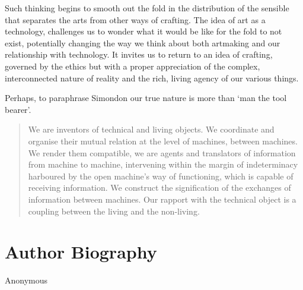 \documentclass[letterpaper]{article}
\begin{document}
    Such thinking begins to smooth out the fold in the distribution of the sensible that separates the arts from other ways of crafting. The idea of art as a technology, challenges us to wonder what it would be like for the fold to not exist, potentially changing the way we think about both artmaking and our relationship with technology. It invites us to return to an idea of crafting, governed by the ethics but with a proper appreciation of the complex, interconnected nature of reality and the rich, living agency of our various things.
        
    Perhaps, to paraphrase Simondon our true nature is more than ‘man the tool bearer’.
    
    \begin{quote}
        We are inventors of technical and living objects. We coordinate and organise their mutual relation at the level of machines, between machines. We render them compatible, we are agents and translators of information from machine to machine, intervening within the margin of indeterminacy harboured by the open machine's way of functioning, which is capable of receiving information. We construct the signification of the exchanges of information between machines. Our rapport with the technical object is a coupling between the living and the non-living. \citep[p.xvi]{SimondonOnThMdOfExstncOfTechnclObjcts1980}
    \end{quote}




\section{Author Biography}

Anonymous 
\end{document}
